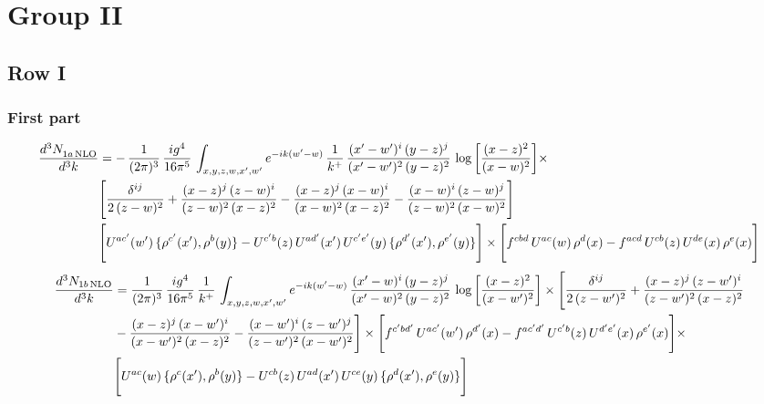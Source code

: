 \documentclass[9pt]{article}
\numberwithin{equation}{section}
\begin{document}
\section{Group II}
\subsection{Row I}
\subsubsection{First part}
\begin{align}
 \frac{d^{3}N_{1a\,\rm NLO}^{\rm}}{d^{3}k}  & = -\,\frac{1}{(2\pi)^{3}}\,\frac{ig^{4}}{16\pi^{5}}\,\int_{x,y,z,w,x',w^{\prime}} e^{-ik(w^{\prime}-w)}\,\frac{1}{k^{+}}\, \frac{(x'-w')^{i}\,(y-z)^{j}}{(x'-w')^{2}\,(y-z)^{2}}\,\log{\left[\frac{(x-z)^{2}}{(x-w)^{2}}\right]}\times\notag \\ &  \Bigg[\frac{\delta^{ij}}{2\,(z-w)^{2}}+\frac{(x-z)^{j}\,(z-w)^{i}}{(z-w)^{2}\,(x-z)^{2}}-\frac{(x-z)^{j}\,(x-w)^{i}}{(x-w)^{2}\,(x-z)^{2}}-\frac{(x-w)^{i}\,(z-w)^{j}}{(z-w)^{2}\,(x-w)^{2}}\Bigg] \notag \\ & \Bigg[U^{ac'}(w')\,\{\rho^{c'}(x'),\rho^{b}(y)\}-U^{c'b}(z)\,U^{ad'}(x')\,U^{c'e'}(y)\, \{\rho^{d'}(x'),\rho^{e'}(y)\}\Bigg]\times \Bigg[f^{cbd}\,U^{ac}(w)\,\rho^{d}(x)-f^{acd}\, U^{cb}(z)\,U^{de}(x)\,\rho^{e}(x)\Bigg]
\end{align}
\begin{align}
\frac{d^{3}N_{1b\, \rm NLO}}{d^{3}k} & =  \frac{1}{(2\pi)^{3}}\,\frac{ig^{4}}{16\pi^{5}}\,\frac{1}{k^{+}}\,\int_{x,y,z,w,x',w^{\prime}} e^{-ik(w^{\prime}-w)}\,  \frac{(x'-w)^{i}\,(y-z)^{j}}{(x'-w)^{2}\,(y-z)^{2}}\,\log{\left[\frac{(x-z)^{2}}{(x-w')^{2}}\right]}\times \Bigg[\frac{\delta^{ij}}{2\,(z-w')^{2}}+\frac{(x-z)^{j}\,(z-w')^{i}}{(z-w')^{2}\,(x-z)^{2}}\notag \\ &  -\frac{(x-z)^{j}\,(x-w')^{i}}{(x-w')^{2}\,(x-z)^{2}} -\frac{(x-w')^{i}\,(z-w')^{j}}{(z-w')^{2}\,(x-w')^{2}}\Bigg] \times\Bigg[f^{c'bd'}\,U^{ac'}(w')\,\rho^{d'}(x)-f^{ac'd'}\, U^{c'b}(z)\,U^{d'e'}(x)\,\rho^{e'}(x)\Bigg] \times\notag \\ &  \Bigg[U^{ac}(w)\,\{\rho^{c}(x'),\rho^{b}(y)\}-U^{cb}(z)\,U^{ad}(x')\,U^{ce}(y)\, \{\rho^{d}(x'),\rho^{e}(y)\}\Bigg]
\end{align}
\end{document}
